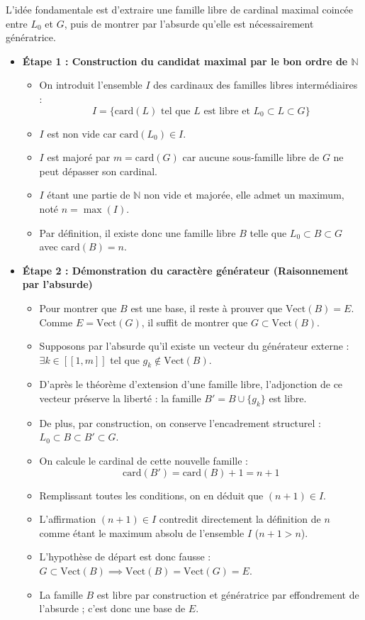 \documentclass[11pt, a4paper]{article}
\theoremstyle{definition}
\begin{document}
L'idée fondamentale est d'extraire une famille libre de cardinal maximal coincée entre $L_0$ et $G$, puis de montrer par l'absurde qu'elle est nécessairement génératrice.

\begin{itemize}
\item \textbf{Étape 1 : Construction du candidat maximal par le bon ordre de $\mathbb{N}$}
\begin{itemize}
\item On introduit l'ensemble $I$ des cardinaux des familles libres intermédiaires :
\[
I = \{\text{card}(L) \text{ tel que } L \text{ est libre et } L_0 \subset L \subset G\}
\]
\item $I$ est non vide car $\text{card}(L_0) \in I$.
\item $I$ est majoré par $m = \text{card}(G)$ car aucune sous-famille libre de $G$ ne peut dépasser son cardinal.
\item $I$ étant une partie de $\mathbb{N}$ non vide et majorée, elle admet un maximum, noté $n = \max(I)$.
\item Par définition, il existe donc une famille libre $B$ telle que $L_0 \subset B \subset G$ avec $\text{card}(B) = n$.
\end{itemize}
\item \textbf{Étape 2 : Démonstration du caractère générateur (Raisonnement par l'absurde)}
\begin{itemize}
\item Pour montrer que $B$ est une base, il reste à prouver que $\text{Vect}(B) = E$. Comme $E = \text{Vect}(G)$, il suffit de montrer que $G \subset \text{Vect}(B)$.
\item Supposons par l'absurde qu'il existe un vecteur du générateur externe : $\exists k \in [\![1, m]\!]$ tel que $g_k \notin \text{Vect}(B)$.
\item D'après le théorème d'extension d'une famille libre, l'adjonction de ce vecteur préserve la liberté : la famille $B' = B \cup \{g_k\}$ est libre.
\item De plus, par construction, on conserve l'encadrement structurel : $L_0 \subset B \subset B' \subset G$.
\item On calcule le cardinal de cette nouvelle famille :
\[
\text{card}(B') = \text{card}(B) + 1 = n + 1
\]

\item Remplissant toutes les conditions, on en déduit que $(n+1) \in I$.
\item L'affirmation $(n+1) \in I$ contredit directement la définition de $n$ comme étant le maximum absolu de l'ensemble $I$ ($n + 1 > n$).
\item L'hypothèse de départ est donc fausse : $G \subset \text{Vect}(B) \implies \text{Vect}(B) = \text{Vect}(G) = E$.
\item La famille $B$ est libre par construction et génératrice par effondrement de l'absurde ; c'est donc une base de $E$.
\end{itemize}
\end{itemize}
\end{document}
